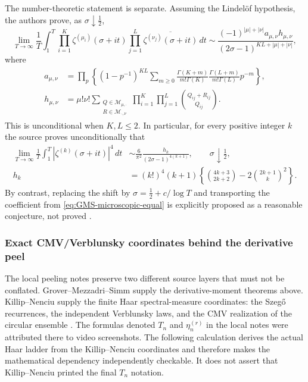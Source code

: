 The number-theoretic statement is separate.  Assuming the Lindel\"of hypothesis, the authors
prove, as $\sigma\downarrow\tfrac12$,
\begin{equation}
 \lim_{T\to\infty}\frac1T\int_1^T
 \prod_{i=1}^{K}\zeta^{(\mu_i)}(\sigma+it)
 \prod_{j=1}^{L}\overline{\zeta^{(\nu_j)}(\sigma+it)}\,dt
 \sim
 \frac{(-1)^{|\mu|+|\nu|}a_{\mu,\nu}h_{\mu,\nu}}
 {(2\sigma-1)^{KL+|\mu|+|\nu|}},
 \label{eq:GMS-zeta-off-line}
\end{equation}
where
\begin{align}
 a_{\mu,\nu}
 &=\prod_p\left\{(1-p^{-1})^{KL}
 \sum_{m\ge0}
 \frac{\Gamma(K+m)}{m!\Gamma(K)}
 \frac{\Gamma(L+m)}{m!\Gamma(L)}p^{-m}\right\},\\
 h_{\mu,\nu}
 &=\mu!\nu!
 \sum_{\substack{Q\in\mathcal M_{\mu,\cdot}\\R\in\mathcal M_{\cdot,\nu}}}
 \prod_{i=1}^{K}\prod_{j=1}^{L}
 \binom{Q_{ij}+R_{ij}}{Q_{ij}}.
\end{align}
This is unconditional when $K,L\le2$.  In particular, for every positive integer $k$ the
source proves unconditionally that
\begin{align}
 \lim_{T\to\infty}\frac1T\int_1^T
 \left|\zeta^{(k)}(\sigma+it)\right|^4\,dt
 &\sim \frac{6}{\pi^2}\frac{h_k}{(2\sigma-1)^{4(k+1)}},
 \qquad \sigma\downarrow\tfrac12,\label{eq:GMS-zeta-fourth}\\
 h_k&=(k!)^4(k+1)
 \left\{\binom{4k+3}{2k+2}-2\binom{2k+1}{k}^2\right\}.
 \label{eq:GMS-hk}
\end{align}
By contrast, replacing the shift by
$\sigma=\tfrac12+c/\log T$ and transporting the coefficient from
\eqref{eq:GMS-microscopic-equal} is explicitly proposed as a reasonable conjecture, not proved
\cite[Prop.~1.3, Thm.~1.4, and the paragraph following eq.~(1.22)]{groverMezzadriSimm2026}.




\subsubsection{Exact CMV/Verblunsky coordinates behind the derivative peel}

The local peeling notes preserve two different source layers that must not be conflated.
Grover--Mezzadri--Simm supply the derivative-moment theorems above.  Killip--Nenciu supply
the finite Haar spectral-measure coordinates: the Szeg\H{o} recurrences, the independent
Verblunsky laws, and the CMV realization of the circular ensemble
\cite[eqs.~(2.1)--(2.2), Prop.~3.3, Thm.~1, and App.~B]{killipNenciu2004}.
The formulas denoted $T_n$ and $\eta_n^{(r)}$ in the local notes were attributed there to
video screenshots.  The following calculation derives the actual Haar ladder from the
Killip--Nenciu coordinates and therefore makes the mathematical dependency independently
checkable.  It does not assert that Killip--Nenciu printed the final $T_n$ notation.

